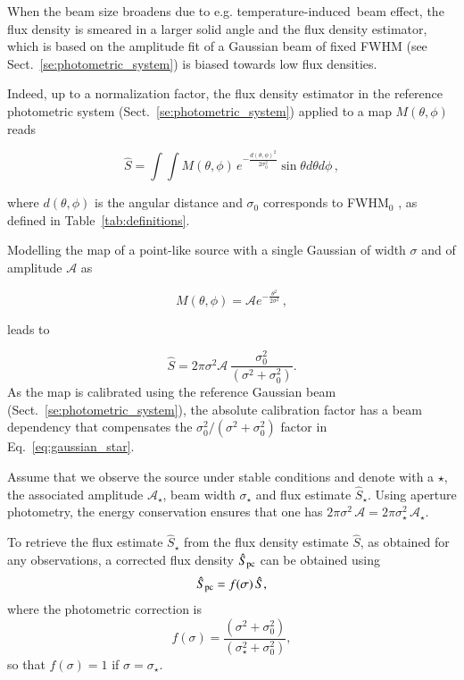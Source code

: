 \documentclass[traditionalabstract]{aa}
\newcommand{\afternoon}{temperature-induced}
\begin{document}
\begin{appendix}
When the beam size broadens due to e.g. \afternoon\ beam effect, the flux
density is smeared in a larger solid angle and the flux density estimator, which
is based on the amplitude fit of a Gaussian beam of fixed FWHM (see
Sect.~\ref{se:photometric_system}) is biased towards low flux
densities.

Indeed, up to a normalization factor, the flux density
estimator in the reference photometric system (Sect.~\ref{se:photometric_system}) applied to a map
$M(\theta,\phi)$ reads

\begin{equation}
  \hat{S}  = \int \int M(\theta, \phi)\, e^{-\frac{d(\theta,\phi)^{2}}{2\sigma_{0}^{2}}} \sin \theta d\theta d\phi\,,
  \label{eq:flux_density_estimator}
\end{equation}

where $d(\theta,\phi)$ is the angular distance and $\sigma_0$
corresponds to FWHM$_0$
, as defined in Table~\ref{tab:definitions}.

Modelling the map of a point-like source with a single Gaussian of
width $\sigma$ and of amplitude $\mathcal{A}$ as

\begin{equation}
  M(\theta, \phi) = \mathcal{A} e^{-\frac{\theta^{2}}{2\sigma^2}}\,,
  \label{eq:pointsource_map}
\end{equation}

leads to

\begin{equation}
  \hat{S}  = 2\pi \sigma^2 \mathcal{A} \,  \frac{\sigma_0^2}{(\sigma^2 + \sigma_0^2)}.
  \label{eq:gaussian_star}
\end{equation}
As the map is calibrated using the reference Gaussian beam
(Sect.~\ref{se:photometric_system}), the absolute calibration factor %
has a beam dependency that compensates the
$\sigma_0^2/(\sigma^2 + \sigma_0^2)$ factor in Eq.~\ref{eq:gaussian_star}.

Assume that we observe the source under stable conditions and
denote with a $\star$, the associated amplitude $\mathcal{A}_\star$, beam width
$\sigma_\star$ and flux estimate $\hat{S}_\star$. Using aperture
photometry, the energy conservation ensures that one has
$2\pi\sigma^2 \, \mathcal{A} = 2\pi\sigma_\star^2 \, \mathcal{A_\star}$.

To retrieve the flux estimate $\hat{S}_\star$ from the flux density
estimate $\hat{S}$, as obtained for any observations, a
corrected flux density $\hat{S}_{\rm{pc}}$ can be obtained using 
\begin{equation}
  \hat{S}_{\rm{pc}} = f(\sigma) \, \hat{S},
\end{equation} 
where the photometric correction is 
\begin{equation}
  f(\sigma) = \frac{(\sigma^2 + \sigma_0^2)}{(\sigma_\star^2+\sigma_0^2)}, 
\end{equation} 
so that $f(\sigma) = 1$ if $\sigma=\sigma_\star$.


\end{appendix}
\end{document}
